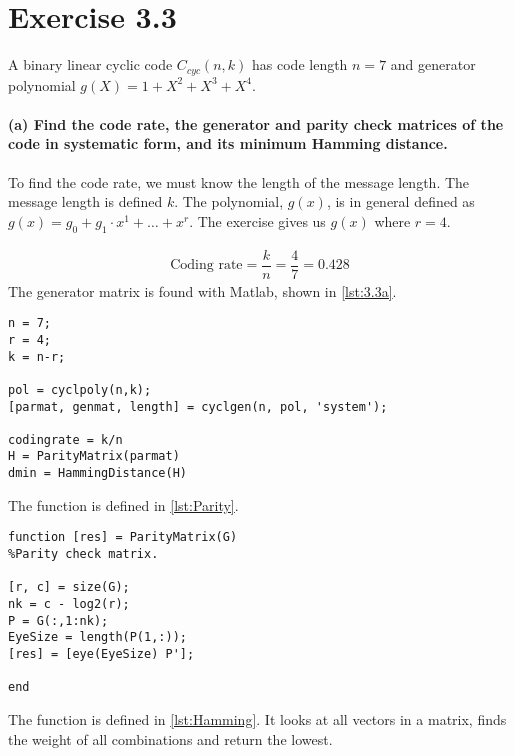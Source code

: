 \documentclass[Main]{subfiles}
\begin{document}
\section*{Exercise 3.3}

A binary linear cyclic code $C_{cyc}(n, k)$ has code length $n = 7$ and generator polynomial $g(X) = 1 + X^2 + X^3 + X^4$.

\paragraph{(a) Find the code rate, the generator and parity check matrices of the code in
systematic form, and its minimum Hamming distance.}

To find the code rate, we must know the length of the message length.
The message length is defined $k$.
The polynomial, $g(x)$, is in general defined as $g(x) = g_0 + g_1\cdot x^1 + \ldots + x^r$.
The exercise gives us $g(x)$ where $r = 4$.

\begin{align}
\text{Coding rate} = \dfrac{k}{n} = \dfrac{4}{7} = 0.428
\end{align}
The generator matrix is found with Matlab, shown in \codeTitle \ref{lst:3.3a}.

\begin{lstlisting}[caption=Matlab script for exercise 3.3 a, style=Code-Matlab, label=lst:3.3a]
n = 7;
r = 4;
k = n-r;

pol = cyclpoly(n,k);
[parmat, genmat, length] = cyclgen(n, pol, 'system');

codingrate = k/n
H = ParityMatrix(parmat)
dmin = HammingDistance(H)
\end{lstlisting}
The function  is defined in \codeTitle \ref{lst:Parity}.

\begin{lstlisting}[caption=Matlab script a parity matrix, style=Code-Matlab, label=lst:Parity]
function [res] = ParityMatrix(G)
%Parity check matrix.

[r, c] = size(G);
nk = c - log2(r);
P = G(:,1:nk);
EyeSize = length(P(1,:));
[res] = [eye(EyeSize) P'];

end
\end{lstlisting}
The function  is defined in \codeTitle \ref{lst:Hamming}.
It looks at all vectors in a matrix, finds the weight of all combinations and return the lowest.
\end{document}
